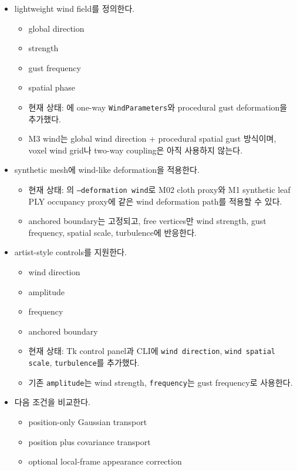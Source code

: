 \documentclass[10pt]{article}
\newcommand{\done}{\textcolor{DoneGreen}{\(\boxtimes\)}}
\newcommand{\code}[1]{\texttt{#1}}
\begin{document}
\begin{itemize}
  \item[\done] lightweight wind field를 정의한다.
    \begin{itemize}
      \item global direction
      \item strength
      \item gust frequency
      \item spatial phase
      \item 현재 상태: 에 one-way \code{WindParameters}와 procedural gust deformation을 추가했다.
      \item M3 wind는 global wind direction + procedural spatial gust 방식이며, voxel wind grid나 two-way coupling은 아직 사용하지 않는다.
    \end{itemize}
  \item[\done] synthetic mesh에 wind-like deformation을 적용한다.
    \begin{itemize}
      \item 현재 상태: 의 \code{--deformation wind}로 M02 cloth proxy와 M1 synthetic leaf PLY occupancy proxy에 같은 wind deformation path를 적용할 수 있다.
      \item anchored boundary는 고정되고, free vertices만 wind strength, gust frequency, spatial scale, turbulence에 반응한다.
    \end{itemize}
  \item[\done] artist-style controls를 지원한다.
    \begin{itemize}
      \item wind direction
      \item amplitude
      \item frequency
      \item anchored boundary
      \item 현재 상태: Tk control panel과 CLI에 \code{wind direction}, \code{wind spatial scale}, \code{turbulence}를 추가했다.
      \item 기존 \code{amplitude}는 wind strength, \code{frequency}는 gust frequency로 사용한다.
    \end{itemize}
  \item[\done] 다음 조건을 비교한다.
    \begin{itemize}
      \item position-only Gaussian transport
      \item position plus covariance transport
      \item optional local-frame appearance correction

\end{itemize}
\end{itemize}
\end{document}

